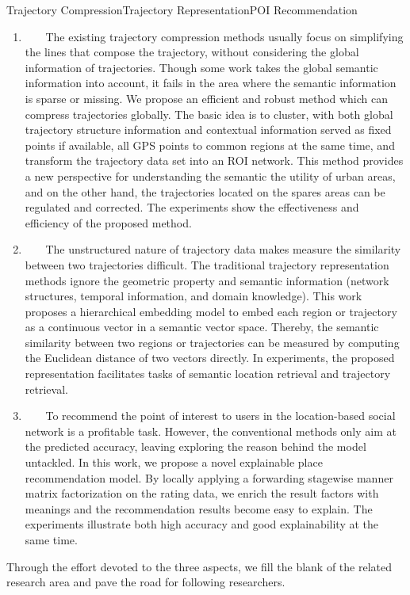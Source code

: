 \begin{Eabstract}{Trajectory Compression}{Trajectory Representation}{POI Recommendation}{}{}
\begin{enumerate}
\item ~~~ The existing trajectory compression methods usually focus on simplifying the lines that compose the trajectory, without considering the global information of trajectories. Though some work takes the global semantic information into account, it fails in the area where the semantic information is sparse or missing. We propose an efficient and robust method which can compress trajectories globally. The basic idea is to cluster, with both global trajectory structure information and contextual information served as fixed points if available, all GPS points to common regions at the same time, and transform the trajectory data set into an ROI network. This method provides a new perspective for understanding the semantic the utility of urban areas, and on the other hand, the trajectories located on the spares areas can be regulated and corrected. The experiments show the effectiveness and efficiency of the proposed method.
\item ~~~ The unstructured nature of trajectory data makes measure the similarity between two trajectories difficult. The traditional trajectory representation methods ignore the geometric property and semantic information (network structures, temporal information, and domain knowledge). This work proposes a hierarchical embedding model to embed each region or trajectory as a continuous vector in a semantic vector space. Thereby, the semantic similarity between two regions or trajectories can be measured by computing the Euclidean distance of two vectors directly. In experiments, the proposed representation facilitates tasks of semantic location retrieval and trajectory retrieval.

\item ~~~ To recommend the point of interest to users in the location-based social network is a profitable task. However, the conventional methods only aim at the predicted accuracy, leaving exploring the reason behind the model untackled. In this work, we propose a novel explainable place recommendation model. By locally applying a forwarding stagewise manner matrix factorization on the rating data, we enrich the result factors with meanings and the recommendation results become easy to explain. The experiments illustrate both high accuracy and good explainability at the same time.
\end{enumerate}

Through the effort devoted to the three aspects, we fill the blank of the related research area and pave the road for following researchers.
\end{Eabstract}
